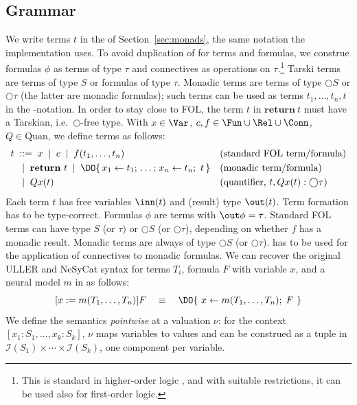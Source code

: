 \documentclass[anon]{../../journal-templates/NeSy26/nesy2026} %
\renewcommand{\ednote}[1]{\textcolor{red}{[#1]}}
\begin{document}
\subsection{Grammar}
\label{sec:layer-grammatical}

We write terms $t$ in the \doNotation  of
Section~\ref{sec:monads}, the same notation the implementation uses. To avoid duplication of \doNotation for terms and formulas, we construe formulas $\phi$ as terms of type $\tau$ and connectives as operations on $\tau$.\footnote{This is standard in higher-order logic \citep{church1940formulation,Andrews86}, and with suitable restrictions, it can be used also for first-order logic.} Tarski terms are terms of type $S$ or formulas of type $\tau$. Monadic terms are terms of type $\bigcirc S$ or $\bigcirc \tau$ (the latter are monadic formulas); such terms can be used as terms $t_1,\ldots,t_n,t$ in the \DO-notation. In order to stay close to FOL, the term $t$ in $\mathbf{return}\ t$ must have a Tarskian, i.e.\ $\bigcirc$-free type.
With
$x \in \Var$, $c,f \in \Fun\cup\Rel\cup\Conn$, $Q \in \mathrm{Quan}$, we define terms as follows:
\[
  \begin{aligned}
    t \;&::=\; x \;\mid\; c \;\mid\; f(t_1,\ldots,t_n) && \text{(standard FOL term/formula)}\\
    &\;\mid\; \mathbf{return}\ t \;\mid\;  \DO\{\, x_1 \leftarrow t_1;\, \ldots;\, x_n \leftarrow t_n;\ t \,\} 
    && \text{(monadic term/formula)}\\
    &\;\mid\; Qx(t) && \text{(quantifier, $t,Qx(t):\bigcirc \tau$)}\\
  \end{aligned}
  \]
  Each term $t$ has free variables $\inn(t)$ and (result) type $\out(t)$.
  Term formation has to be type-correct.
  Formulas $\phi$ are terms with $\out\phi=\tau$.
Standard FOL terms can have type $S$ (or $\tau)$ or $\bigcirc S$ (or $\bigcirc \tau$), depending on whether $f$ has a monadic result. Monadic terms are always of type $\bigcirc S$ (or $\bigcirc \tau$).
\doNotation has to be used for the application of connectives to monadic formulas.  
We can recover the original ULLER and NeSyCat syntax for terms $T_i$, formula $F$ with variable $x$, and a neural model $m$ in \nesycattorch as follows:
$$[x:=m(T_1,\dots,T_n)]F \quad \equiv \quad \DO \{\ x\leftarrow m(T_1,\dots,T_n);\; F\ \} $$
\noindent
We define the semantics \emph{pointwise} at a 
valuation $\nu$: for the context $[x_1{:}S_1,\ldots,x_k{:}S_k]$, $\nu$ maps variables to values and can be construed as a tuple in
$\mathcal I(S_1) \times \cdots \times \mathcal I(S_k)$, one component per variable. 
\end{document}
